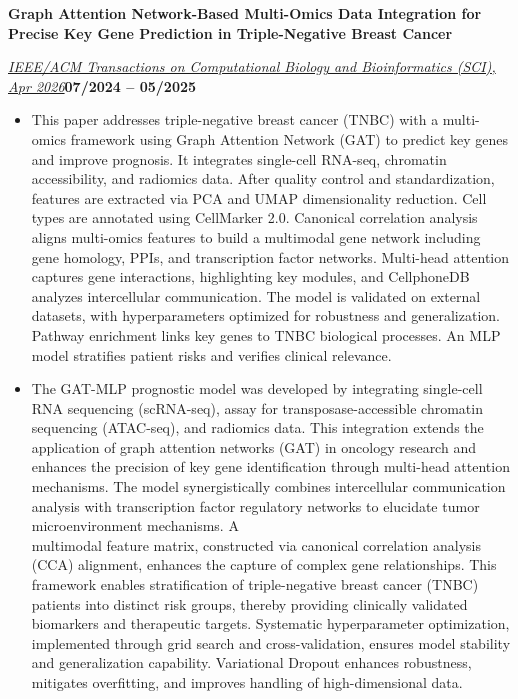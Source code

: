\documentclass[10pt,a4paper]{article}
\newcommand{\titleline}[1]{\par\noindent\textbf{#1}\par}
\newcommand{\venueline}[2]{\par\noindent\uline{\textit{#1}}\hfill\textbf{#2}\par}
\newenvironment{cvitems}{%
  \begin{itemize}[leftmargin=14.20bp,labelwidth=4.20bp,labelsep=10.00bp,align=left,
    topsep=0bp,itemsep=0bp,parsep=0bp,partopsep=0bp,label={\textbullet}]
}{\end{itemize}}
\begin{document}
\vspace{1.92bp}\titleline{Graph Attention Network-Based Multi-Omics Data Integration for Precise Key Gene Prediction in Triple-Negative Breast Cancer}
\venueline{IEEE/ACM Transactions on Computational Biology and Bioinformatics (SCI), Apr 2026}{07/2024 -- 05/2025}
\begin{cvitems}
\item This paper addresses triple-negative breast cancer (TNBC) with a multi-omics framework using Graph Attention Network (GAT) to predict key genes and improve prognosis. It integrates single-cell RNA-seq, chromatin accessibility, and radiomics data. After quality control and standardization, features are extracted via PCA and UMAP dimensionality reduction. Cell types are annotated using CellMarker 2.0. Canonical correlation analysis aligns multi-omics features to build a multimodal gene network including gene homology, PPIs, and transcription factor networks. Multi-head attention captures gene interactions, highlighting key modules, and CellphoneDB analyzes intercellular communication. The model is validated on external datasets, with hyperparameters optimized for robustness and generalization. Pathway enrichment links key genes to TNBC biological processes. An MLP model stratifies patient risks and verifies clinical relevance.
\item The GAT-MLP prognostic model was developed by integrating single-cell RNA sequencing (scRNA-seq), assay for transposase-accessible chromatin sequencing (ATAC-seq), and radiomics data. This integration extends the application of graph attention networks (GAT) in oncology research and enhances the precision of key gene identification through multi-head attention mechanisms. The model synergistically combines intercellular communication analysis with transcription factor regulatory networks to elucidate tumor microenvironment mechanisms. A\\
multimodal feature matrix, constructed via canonical correlation analysis (CCA) alignment, enhances the capture of complex gene relationships. This framework enables stratification of triple-negative breast cancer (TNBC) patients into distinct risk groups, thereby providing clinically validated biomarkers and therapeutic targets. Systematic hyperparameter optimization, implemented through grid search and cross-validation, ensures model stability and generalization capability. Variational Dropout enhances robustness, mitigates overfitting, and improves handling of high-dimensional data.
\end{cvitems}
\end{document}
